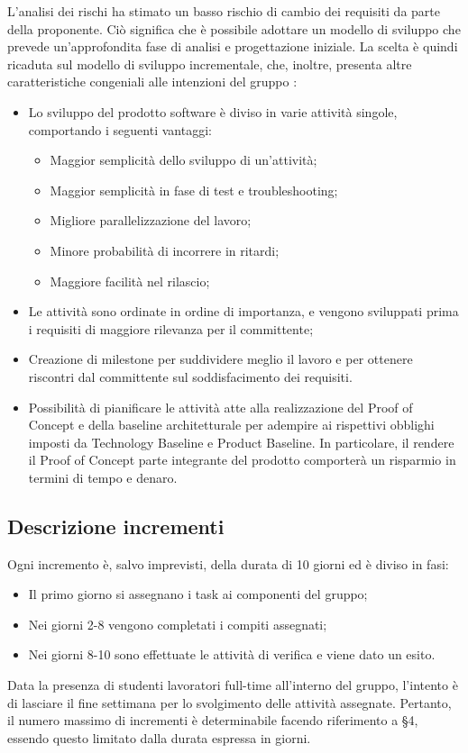 L'analisi dei rischi ha stimato un basso rischio di cambio dei requisiti da parte della proponente.
Ciò significa che è possibile adottare un modello di sviluppo che prevede un'approfondita fase di 
analisi e progettazione iniziale.
La scelta è quindi ricaduta sul modello di sviluppo incrementale, che, inoltre, presenta altre
caratteristiche congeniali alle intenzioni del gruppo \gruppo \space :
\begin{itemize}
    \item Lo sviluppo del prodotto software è diviso in varie attività singole, comportando i seguenti vantaggi:
    \begin{itemize}
    	\item Maggior semplicità dello sviluppo di un'attività;
    	\item Maggior semplicità in fase di test e {troubleshooting};
    	\item Migliore parallelizzazione del lavoro;
    	\item Minore probabilità di incorrere in ritardi;
    	\item Maggiore facilità nel rilascio;
    \end{itemize}
    \item Le attività sono ordinate in ordine di importanza, e vengono sviluppati prima i requisiti di maggiore rilevanza per il committente;
    \item Creazione di milestone per suddividere meglio il lavoro e per ottenere riscontri dal committente sul soddisfacimento dei requisiti.
    \item Possibilità di pianificare le attività atte alla realizzazione del {Proof of Concept} e della baseline architetturale per adempire ai rispettivi obblighi imposti da Technology Baseline e Product Baseline. In particolare, il rendere il Proof of Concept parte integrante del prodotto comporterà un risparmio in termini di tempo e denaro.
\end{itemize}

\subsection{Descrizione incrementi}
Ogni incremento è, salvo imprevisti, della durata di 10 giorni ed è diviso in fasi:
\begin{itemize}
\item Il primo giorno si assegnano i task ai componenti del gruppo;
\item Nei giorni 2-8 vengono completati i compiti assegnati;
\item Nei giorni 8-10 sono effettuate le attività di verifica e viene dato un esito.
\end{itemize}
Data la presenza di studenti lavoratori full-time all'interno del gruppo, l'intento è di lasciare il fine settimana per lo svolgimento delle attività assegnate.
Pertanto, il numero massimo di incrementi è determinabile facendo riferimento a §4, essendo questo limitato dalla durata espressa in giorni.